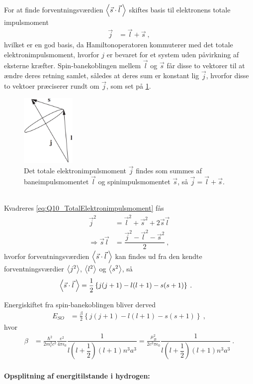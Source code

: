 For at finde forventningsværdien $\Braket{\Vec{s} \cdot \Vec{l} \: }$ skiftes basis til elektronens totale impulsmoment
\begin{align} \label{eq:Q10_TotalElektronimpulsmoment}
    \Vec{j} &= \Vec{l} + \Vec{s} \: ,
\end{align}
hvilket er en god basis, da Hamiltonoperatoren kommuterer med det totale elektronimpulsmoment, hvorfor $j$ er bevaret for et system uden påvirkning af eksterne kræfter. Spin-banekoblingen mellem $\Vec{l}$ og $\Vec{s}$ får disse to vektorer til at ændre deres retning samlet, således at deres sum er konstant lig $\Vec{j}$, hvorfor disse to vektoer præciserer rundt om $\Vec{j}$, som set på \cref{fig:Q10_TotalElektronimpulsmoment}.
\begin{figure}[!h]
    \centering
    \includegraphics[width=0.23\textwidth]{Q10/images/AtomicQuantumNumberJ.PNG}
    \caption{Det totale elektronimpulsmoment $\Vec{j}$ findes som summes af baneimpulsmomentet $\Vec{l}$ og spinimpulsmomentet $\Vec{s}$, så $\Vec{j} = \Vec{l} + \Vec{s}$.}
    \label{fig:Q10_TotalElektronimpulsmoment}
\end{figure}\\
Kvadreres \cref{eq:Q10_TotalElektronimpulsmoment} fås
\begin{align}
    \Vec{j}^2 &= \Vec{l}^2 + \Vec{s}^2 + 2\Vec{s}\Vec{l} \nonumber\\
    \Rightarrow \Vec{s}\Vec{l} &= \dfrac{\Vec{j}^2 - \Vec{l}^2 - \Vec{s}^2}{2} \: ,
\end{align}
hvorfor forventningsværdien $\Braket{\Vec{s} \cdot \Vec{l} \: }$ kan findes ud fra den kendte forventningsværdier $\Braket{j^2}$, $\Braket{l^2}$ og $\Braket{s^2}$, så
\begin{align}
    \Braket{\Vec{s} \cdot \Vec{l} \: } &= \frac{1}{2}\left\{j(j+1) - l(l+1) - s(s+1)\right\} \: .
\end{align}

Energiskiftet fra spin-banekoblingen bliver derved
\begin{align} \label{eq:Q10_EnergiskiftSpinOrbitForHydrogen}
    E_{SO} &= \frac{\beta}{2} \left\{j(j+1) - l(l+1) - s(s+1)\right\} \: ,
\end{align}
hvor
\begin{align}
    \beta &= \frac{\hbar^2}{2m_e^2c^2} \frac{e^2}{4\pi\epsilon_0} \dfrac{1}{l\left(l+\dfrac{1}{2}\right)\left(l + 1\right) n^3a^3} = \frac{\mu_B^2}{2c^2\pi\epsilon_0} \dfrac{1}{l\left(l+\dfrac{1}{2}\right)\left(l + 1\right) n^3a^3} \: .
\end{align}

\paragraph{Opsplitning af energitilstande i hydrogen:}
